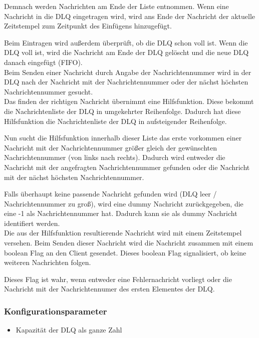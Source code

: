 \documentclass{article}
\begin{document}
Demnach werden Nachrichten am Ende der Liste entnommen. Wenn eine Nachricht in die DLQ eingetragen wird, wird ans Ende
der Nachricht der aktuelle Zeitstempel zum Zeitpunkt des Einfügens hinzugefügt.

Beim Eintragen wird außerdem überprüft, ob die DLQ schon voll ist. Wenn die DLQ voll ist, wird die Nachricht am Ende der
DLQ gelöscht und die neue DLQ danach eingefügt (FIFO).\\

Beim Senden einer Nachricht durch Angabe der Nachrichtennummer wird in der DLQ nach der Nachricht mit der
Nachrichtennummer oder der nächst höchsten Nachrichtennummer gesucht.\\

Das finden der richtigen Nachricht übernimmt eine Hilfsfunktion. Diese bekommt die Nachrichtenliste der DLQ in
umgekehrter Reihenfolge. Dadurch hat diese Hilfsfunktion die Nachrichtenliste der DLQ in aufsteigender Reihenfolge.

Nun sucht die Hilfsfunktion innerhalb dieser Liste das erste vorkommen einer Nachricht mit der Nachrichtennummer größer
gleich der gewünschten Nachrichtennummer (von links nach rechts). Dadurch wird entweder die Nachricht mit der angefragten Nachrichtennummer
gefunden oder die Nachricht mit der nächst höchsten Nachrichtennummer.

Falls überhaupt keine passende Nachricht gefunden wird (DLQ leer / Nachrichtennummer zu groß), wird eine dummy Nachricht
zurückgegeben, die eine -1 als Nachrichtennummer hat. Dadurch kann sie als dummy Nachricht identifiert werden.\\

Die aus der Hilfsfunktion resultierende Nachricht wird mit einem Zeitstempel versehen. Beim Senden dieser Nachricht wird
die Nachricht zusammen mit einem boolean Flag an den Client gesendet. Dieses boolean Flag signalisiert, ob keine
weiteren Nachrichten folgen.

Dieses Flag ist wahr, wenn entweder eine Fehlernachricht vorliegt oder die Nachricht mit der Nachrichtennumer des ersten
Elementes der DLQ.

\subsubsection{Konfigurationsparameter}
\begin{itemize}
    \item Kapazität der DLQ als ganze Zahl
\end{itemize}
\end{document}
